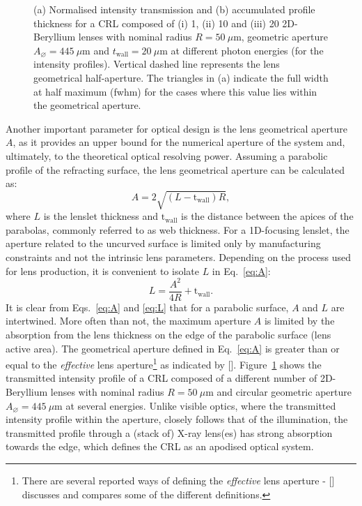 \begin{refsection}
\begin{figure}[t]
    \caption[Intensity transmission and accumulated thickness profile of CRLs]{(a) Normalised intensity transmission and (b) accumulated profile thickness for a CRL composed of ($\mathrm{i}$) 1, ($\mathrm{ii}$) 10 and ($\mathrm{iii}$) 20 2D-Beryllium lenses with nominal radius $R=50~\mu\text{m}$, geometric aperture $A_{\diameter}=445~\mu\text{m}$ and $t_\text{wall}=20~\mu$m at different photon energies (for the intensity profiles). Vertical dashed line represents the lens geometrical half-aperture. The triangles in (a) indicate the full width at half maximum (fwhm) for the cases where this value lies within the geometrical aperture.}
    \label{fig:EffectiveAperure}
\end{figure}
Another important parameter for optical design is the lens geometrical aperture $A$, as it provides an upper bound for the numerical aperture of the system and, ultimately, to the theoretical optical resolving power. Assuming a parabolic profile of the refracting surface, the lens geometrical aperture can be calculated as:
\begin{equation}\label{eq:A}
    A = 2\sqrt{(L-\text{t}_\text{wall})R},
\end{equation}{}
where $L$ is the lenslet thickness and $\text{t}_\text{wall}$ is the distance between the apices of the parabolas, commonly referred to as web thickness. For a 1D-focusing lenslet, the aperture related to the uncurved surface is limited only by manufacturing constraints and not the intrinsic lens parameters. Depending on the process used for lens production, it is convenient to isolate $L$ in Eq.~\ref{eq:A}:
\begin{equation}\label{eq:L}
    L = \frac{A^2}{4R}+\text{t}_\text{wall}.
\end{equation}{}
It is clear from Eqs.~\ref{eq:A} and \ref{eq:L} that for a parabolic surface, $A$ and $L$ are intertwined. More often than not, the maximum aperture $A$ is limited by the absorption from the lens thickness on the edge of the parabolic surface (lens active area). The geometrical aperture defined in Eq.~\ref{eq:A} is greater than or equal to the \textit{effective} lens aperture\footnote{There are several reported ways of defining the \textit{effective} lens aperture - [\cite{Kohn2017}] discusses and compares some of the different definitions. } as indicated by [\cite{Kohn2017}]. Figure~\ref{fig:EffectiveAperure} shows the transmitted intensity profile of a CRL composed of a different number of 2D-Beryllium lenses with nominal radius $R=50~\mu\mathrm{m}$ and circular geometric aperture $A_{\diameter}=445~ \mu\mathrm{m}$ at several energies. Unlike visible optics, where the transmitted intensity profile within the aperture, closely follows that of the illumination, the transmitted profile through a (stack of) X-ray lens(es) has strong absorption towards the edge, which defines the CRL as an apodised optical system.


\end{refsection}
